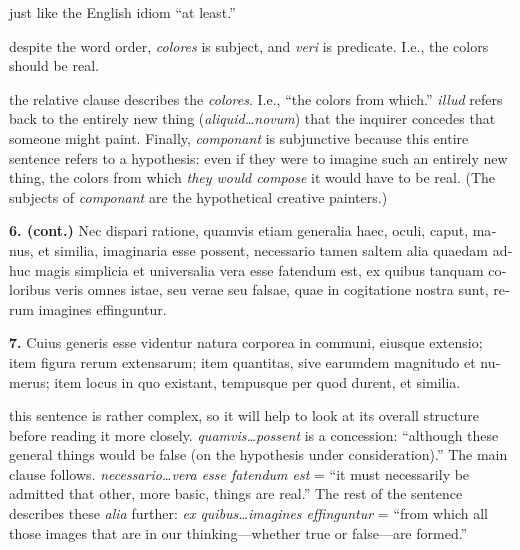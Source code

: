  just like the English idiom ``at least.''

 despite the word order, \textit{colores} is subject, and \textit{veri} is predicate. I.e., the colors should be real.

 the relative clause describes the \textit{colores}. I.e., ``the colors from which.'' \textit{illud} refers back to the entirely new thing (\textit{aliquid\dots novum}) that the inquirer concedes that someone might paint. Finally, \textit{componant} is subjunctive because this entire sentence refers to a hypothesis: even if they were to imagine such an entirely new thing, the colors from which \textit{they would compose} it would have to be real. (The subjects of \textit{componant} are the hypothetical creative painters.)

\clearpage

\beginnumbering
\pstart
{}
\begin{latin}
    \textenglish{\textbf{6. (cont.)}} Nec dispari ratione, quamvis etiam generalia haec, oculi, caput, manus, et similia, imaginaria esse possent, necessario tamen saltem alia quaedam adhuc magis simplicia et universalia vera esse fatendum est, ex quibus tanquam coloribus veris omnes istae, seu verae seu falsae, quae in cogitatione nostra sunt, rerum imagines effinguntur.
\end{latin}
\pend
\endnumbering

\beginnumbering
\pstart
\begin{latin}
   \textenglish{\textbf{7.}} Cuius generis esse videntur natura corporea in communi, eiusque extensio; item figura rerum extensarum; item quantitas, sive earumdem magnitudo et numerus; item locus in quo existant, tempusque per quod durent, et similia.
\end{latin}
\pend
\endnumbering

\prenotes

 this sentence is rather complex, so it will help to look at its overall structure before reading it more closely. \textit{quamvis\dots possent} is a concession: ``although these general things would be false (on the hypothesis under consideration).'' The main clause follows. \textit{necessario\dots vera esse fatendum est} = ``it must necessarily be admitted that other, more basic, things are real.'' The rest of the sentence describes these \textit{alia} further: \textit{ex quibus\dots imagines effinguntur} = ``from which all those images that are in our thinking---whether true or false---are formed.''

